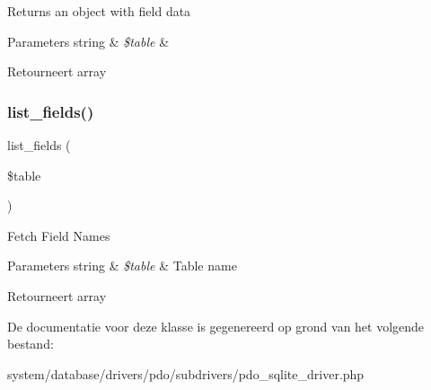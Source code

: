 Returns an object with field data


\begin{DoxyParams}[1]{Parameters}
string & {\em \$table} & \\
\hline
\end{DoxyParams}
\begin{DoxyReturn}{Retourneert}
array 
\end{DoxyReturn}
\mbox{\label{class_c_i___d_b__pdo__sqlite__driver_aef08cd376b16b24608100ca0e3f2f85b}} 
\subsubsection{\texorpdfstring{list\_fields()}{list\_fields()}}
{\footnotesize\ttfamily list\+\_\+fields (\begin{DoxyParamCaption}\item[{}]{\$table }\end{DoxyParamCaption})}

Fetch Field Names


\begin{DoxyParams}[1]{Parameters}
string & {\em \$table} & Table name \\
\hline
\end{DoxyParams}
\begin{DoxyReturn}{Retourneert}
array 
\end{DoxyReturn}


De documentatie voor deze klasse is gegenereerd op grond van het volgende bestand\+:\begin{DoxyCompactItemize}
\item 
system/database/drivers/pdo/subdrivers/pdo\+\_\+sqlite\+\_\+driver.\+php\end{DoxyCompactItemize}
